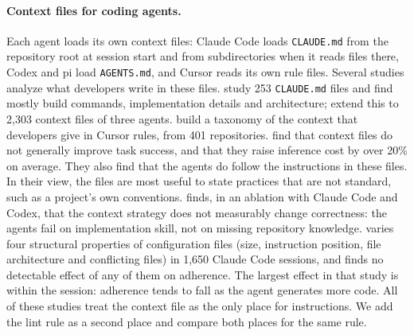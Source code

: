 \documentclass[pdflatex,sn-mathphys-num]{sn-jnl}
\newcommand{\file}[1]{\texttt{#1}}
\begin{document}
\paragraph{Context files for coding agents.}
Each agent loads its own context files: Claude Code loads \file{CLAUDE.md} from the repository root at session start and from subdirectories when it reads files there, Codex and pi load \file{AGENTS.md}, and Cursor reads its own rule files.
Several studies analyze what developers write in these files.
\citet{chatlatanagulchai2025manifests} study 253 \file{CLAUDE.md} files and find mostly build commands, implementation details and architecture; \citet{chatlatanagulchai2025agentreadmes} extend this to 2,303 context files of three agents.
\citet{jiang2026cursorrules} build a taxonomy of the context that developers give in Cursor rules, from 401 repositories.
\citet{gloaguen2026agentsmd} find that context files do not generally improve task success, and that they raise inference cost by over 20\% on average.
They also find that the agents do follow the instructions in these files.
In their view, the files are most useful to state practices that are not standard, such as a project's own conventions.
\citet{khatri2026contextfiles} finds, in an ablation with Claude Code and Codex, that the context strategy does not measurably change correctness: the agents fail on implementation skill, not on missing repository knowledge.
\citet{mcmillan2026adherence} varies four structural properties of configuration files (size, instruction position, file architecture and conflicting files) in 1,650 Claude Code sessions, and finds no detectable effect of any of them on adherence.
The largest effect in that study is within the session: adherence tends to fall as the agent generates more code.
All of these studies treat the context file as the only place for instructions.
We add the lint rule as a second place and compare both places for the same rule.
\end{document}
